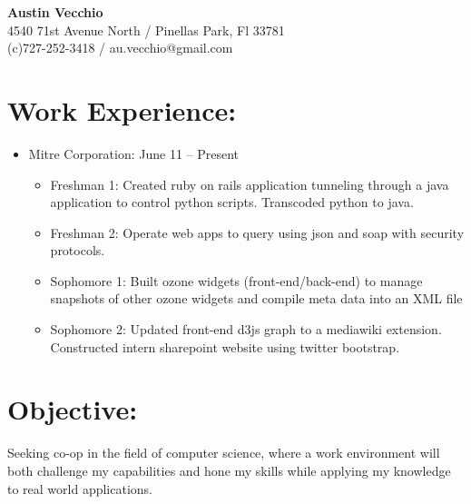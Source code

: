 \documentclass{res}
\begin{document}
\begin{center}
\LARGE{\textbf{Austin Vecchio}}\\
\normalsize{
4540 71st Avenue North / Pinellas Park, Fl 33781\\
(c)727-252-3418 / au.vecchio@gmail.com
}
\end{center}

\section{Work Experience:}
\begin{itemize}
\item Mitre Corporation: \hspace{45pt} June 11 – Present
\begin{itemize}[label=$\circ$]
\item Freshman 1: Created ruby on rails application tunneling through a java application to control python scripts. Transcoded python to java.
\item Freshman 2: Operate web apps to query using json and soap with security protocols.
\item Sophomore 1: Built ozone widgets (front-end/back-end) to manage snapshots of other ozone widgets and compile meta data into an XML file
\item Sophomore 2: Updated front-end d3js graph to a mediawiki extension. Constructed intern sharepoint website using twitter bootstrap.
\end{itemize}
\end{itemize}

\section{Objective:}
Seeking co-op in the field of computer science, where a work environment will both challenge my capabilities and hone my skills while applying my knowledge to real world applications.\\
\end{document}
